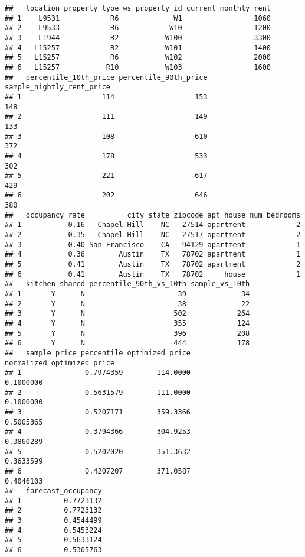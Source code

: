 \documentclass[]{article}
\begin{document}
\begin{verbatim}
##   location property_type ws_property_id current_monthly_rent
## 1    L9531            R6             W1                 1060
## 2    L9533            R6            W10                 1200
## 3    L1944            R2           W100                 3300
## 4   L15257            R2           W101                 1400
## 5   L15257            R6           W102                 2000
## 6   L15257           R10           W103                 1600
##   percentile_10th_price percentile_90th_price sample_nightly_rent_price
## 1                   114                   153                       148
## 2                   111                   149                       133
## 3                   108                   610                       372
## 4                   178                   533                       302
## 5                   221                   617                       429
## 6                   202                   646                       380
##   occupancy_rate          city state zipcode apt_house num_bedrooms
## 1           0.16   Chapel Hill    NC   27514 apartment            2
## 2           0.35   Chapel Hill    NC   27517 apartment            2
## 3           0.40 San Francisco    CA   94129 apartment            1
## 4           0.36        Austin    TX   78702 apartment            1
## 5           0.41        Austin    TX   78702 apartment            2
## 6           0.41        Austin    TX   78702     house            1
##   kitchen shared percentile_90th_vs_10th sample_vs_10th
## 1       Y      N                      39             34
## 2       Y      N                      38             22
## 3       Y      N                     502            264
## 4       Y      N                     355            124
## 5       Y      N                     396            208
## 6       Y      N                     444            178
##   sample_price_percentile optimized_price normalized_optimized_price
## 1               0.7974359        114.0000                  0.1000000
## 2               0.5631579        111.0000                  0.1000000
## 3               0.5207171        359.3366                  0.5005365
## 4               0.3794366        304.9253                  0.3860289
## 5               0.5202020        351.3632                  0.3633599
## 6               0.4207207        371.0587                  0.4046103
##   forecast_occupancy
## 1          0.7723132
## 2          0.7723132
## 3          0.4544499
## 4          0.5453224
## 5          0.5633124
## 6          0.5305763
\end{verbatim}
\end{document}
